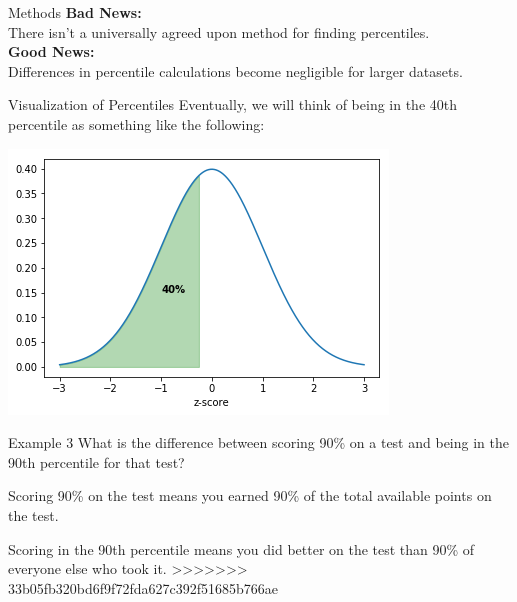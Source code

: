 \documentclass[t]{beamer}
\begin{document}
\begin{frame}{Methods}
\textbf{Bad News:}	\newline\\
There isn't a universally agreed upon method for finding percentiles.	\newline\\	\pause
\textbf{Good News:}	\newline\\	
Differences in percentile calculations become negligible for larger datasets.
\end{frame}

\begin{frame}{Visualization of Percentiles}
Eventually, we will think of being in the 40th percentile as something like the following:	
\begin{center}
\includegraphics[scale=0.6]{../Images/percentile.png}
\end{center}
\end{frame}

\begin{frame}{Example 3}
What is the difference between scoring 90\% on a test and being in the 90th percentile for that test?	\newline\\	\pause

Scoring 90\% on the test means you earned 90\% of the total available points on the test.	\newline\\	\pause

Scoring in the 90th percentile means you did better on the test than 90\% of everyone else who took it.
>>>>>>> 33b05fb320bd6f9f72fda627c392f51685b766ae
\end{frame}
\end{document}

